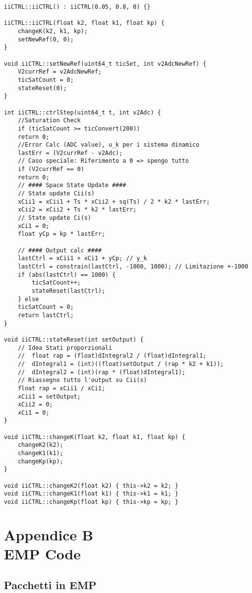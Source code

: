 \begin{lstlisting}[style=cppStyle,caption={Source Classe controllore C(s)},label=lst:controlClassCpp] 
iiCTRL::iiCTRL() : iiCTRL(0.05, 0.8, 0) {}

iiCTRL::iiCTRL(float k2, float k1, float kp) {
	changeK(k2, k1, kp);
	setNewRef(0, 0);
}

void iiCTRL::setNewRef(uint64_t ticSet, int v2AdcNewRef) {
	V2currRef = v2AdcNewRef;
	ticSatCount = 0;
	stateReset(0);
}

int iiCTRL::ctrlStep(uint64_t t, int v2Adc) {
	//Saturation Check
	if (ticSatCount >= ticConvert(200))
	return 0;
	//Error Calc (ADC value), u_k per i sistema dinamico
	lastErr = (V2currRef - v2Adc);
	// Caso speciale: Riferimento a 0 => spengo tutto
	if (V2currRef == 0)
	return 0;
	// #### Space State Update ####
	// State update Cii(s)
	xCii1 = xCii1 + Ts * xCii2 + sq(Ts) / 2 * k2 * lastErr;
	xCii2 = xCii2 + Ts * k2 * lastErr;
	// State update Ci(s)
	xCi1 = 0;
	float yCp = kp * lastErr;
	
	// #### Output calc ####
	lastCtrl = xCii1 + xCi1 + yCp; // y_k
	lastCtrl = constrain(lastCtrl, -1000, 1000); // Limitazione +-1000
	if (abs(lastCtrl) == 1000) {
		ticSatCount++;
		stateReset(lastCtrl);
	} else
	ticSatCount = 0;
	return lastCtrl;
}

void iiCTRL::stateReset(int setOutput) {
	// Idea Stati proporzionali
	//  float rap = (float)dIntegral2 / (float)dIntegral1;
	//  dIntegral1 = (int)((float)setOutput / (rap * k2 + k1));
	//  dIntegral2 = (int)(rap * (float)dIntegral1);
	// Riassegno tutto l'output su Cii(s)
	float rap = xCii1 / xCi1;
	xCii1 = setOutput;
	xCii2 = 0;
	xCi1 = 0;
}

void iiCTRL::changeK(float k2, float k1, float kp) {
	changeK2(k2);
	changeK1(k1);
	changeKp(kp);
}

void iiCTRL::changeK2(float k2) { this->k2 = k2; }
void iiCTRL::changeK1(float k1) { this->k1 = k1; }
void iiCTRL::changeKp(float kp) { this->kp = kp; }
\end{lstlisting}



\chapter*{Appendice B\\ EMP Code} \label{EMPCode}
\setcounter{chapter}{\thechapter + 1}

\section{Pacchetti in EMP}
